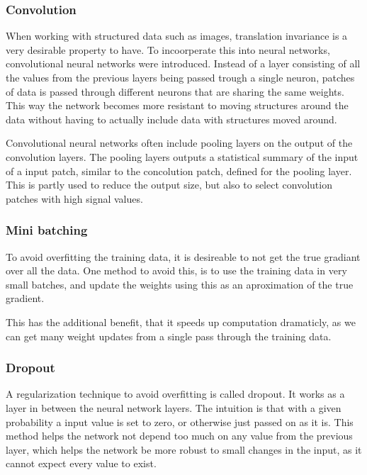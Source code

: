 \subsubsection{Convolution} %
\label{ssub:convolution}
When working with structured data such as images, translation invariance is a very desirable property to have.
To incoorperate this into neural networks, convolutional neural networks were introduced.
Instead of a layer consisting of all the values from the previous layers being passed trough a single neuron, patches of data is passed through different neurons that are sharing the same weights.
This way the network becomes more resistant to moving structures around the data without having to actually include data with structures moved around.

Convolutional neural networks often include pooling layers on the output of the convolution layers.
The pooling layers outputs a statistical summary of the input of a input patch, similar to the concolution patch, defined for the pooling layer.
This is partly used to reduce the output size, but also to select convolution patches with high signal values. 


\subsubsection{Mini batching} %
\label{ssub:mini_batching}
To avoid overfitting the training data, it is desireable to not get the true gradiant over all the data.
One method to avoid this, is to use the training data in very small batches, and update the weights using this as an aproximation of the true gradient.

This has the additional benefit, that it speeds up computation dramaticly, as we can get many weight updates from a single pass through the training data.

\subsubsection{Dropout} %
\label{ssub:dropout}
A regularization technique to avoid overfitting is called dropout.
It works as a layer in between the neural network layers.
The intuition is that with a given probability a input value is set to zero, or otherwise just passed on as it is.
This method helps the network not depend too much on any value from the previous layer, which helps the network be more robust to small changes in the input, as it cannot expect every value to exist.


